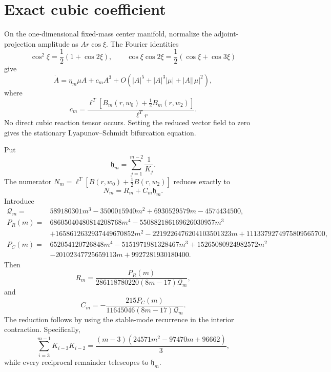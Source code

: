\section*{Exact cubic coefficient}
On the one-dimensional fixed-mass center manifold, normalize the
adjoint-projection amplitude as $A r\cos\xi$.  The Fourier identities
\[
\cos^2\xi=\frac12(1+\cos2\xi),
\qquad
\cos\xi\cos2\xi=\frac12(\cos\xi+\cos3\xi)
\]
give
\[
\dot A=\eta_m\mu A+c_mA^3+
O(|A|^5+|A|^3|\mu|+|A||\mu|^2),
\]
where
\[
c_m=\frac{\ell^T\left[B_m(r,w_0)+\frac12B_m(r,w_2)\right]}{\ell^Tr}.
\]
No direct cubic reaction tensor occurs.
Setting the reduced vector field to zero gives the stationary
Lyapunov--Schmidt bifurcation equation.

Put
\[
\mathfrak h_m=\sum_{j=1}^{m-2}\frac1{K_j}.
\]
The numerator $N_m=\ell^T[B(r,w_0)+\tfrac12B(r,w_2)]$ reduces exactly to
\[
N_m=R_m+C_m\mathfrak h_m.
\]
Introduce
\begin{align*}
\mathcal Q_m={}&589180301m^3-3500015940m^2+6930529579m-4574434500,\\
P_R(m)={}&68605040480814208768m^4-550882186169626030957m^3\\
&+1658612632937449670852m^2-2219226476204103501323m
+1113379274975809565700,\\
P_C(m)={}&652054120726848m^4-5151971981328467m^3
+15265080924982572m^2\\
&-20102347725659113m+9927281930180400.
\end{align*}
Then
\[
R_m=\frac{P_R(m)}{286118780220(8m-17)\mathcal Q_m},
\]
and
\[
C_m=-\frac{215P_C(m)}{11645046(8m-17)\mathcal Q_m}.
\]
The reduction follows by using the stable-mode recurrence in the interior
contraction.  Specifically,
\[
\sum_{i=3}^{m-1}K_{i-3}K_{i-2}
=\frac{(m-3)(24571m^2-97470m+96662)}3,
\]
while every reciprocal remainder telescopes to $\mathfrak h_m$.

